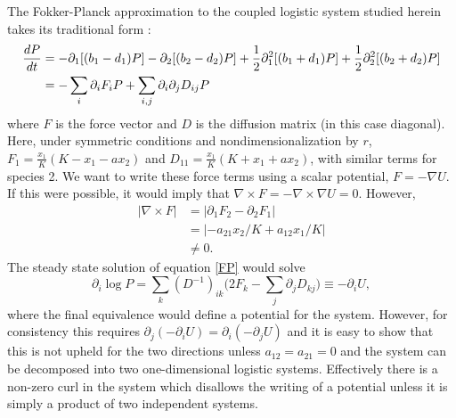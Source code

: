 The Fokker-Planck approximation to the coupled logistic system studied herein takes its traditional form \cite{Nisbet1982}:
\begin{align}
\frac{dP}{dt} &= - \partial_1[(b_1-d_1)P] - \partial_2[(b_2-d_2)P] + \frac{1}{2}\partial_1^2[(b_1+d_1)P] + \frac{1}{2}\partial_2^2[(b_2+d_2)P] \notag \\
&= -\sum_{i} \partial_i F_iP + \sum_{i,j} \partial_i\partial_j D_{ij}P \label{FP}
\end{align}%
where $F$ is the force vector and $D$ is the diffusion matrix (in this case diagonal). 
Here, under symmetric conditions and nondimensionalization by $r$, $F_1 = \frac{x_1}{K}(K - x_1 - a x_2)$ and $D_{11} = \frac{x_1}{K}(K + x_1 + a x_2)$, with similar terms for species 2. 
\iffalse%
We want to write these force terms using a scalar potential, $F=-\nabla U$. %
If this were possible, it would imply that $\nabla \times F = -\nabla \times \nabla U = 0$. 
However,%
\begin{align*}
|\nabla \times F| &= |\partial_1 F_2 - \partial_2 F_1| \\
&= |-a_{21}x_2/K + a_{12}x_1/K| \\
&\neq 0.
\end{align*}
The steady state solution of equation \ref{FP} would solve
\begin{equation*}
\partial_i \log P = \sum_k (D^{-1})_{ik} \big( 2 F_k - \sum_j \partial_j D_{kj} \big) \equiv - \partial_i U,
\end{equation*}
where the final equivalence would define a potential for the system. 
However, for consistency this requires $\partial_j \left( - \partial_i U \right) = \partial_i \left( - \partial_j U \right)$ and it is easy to show that this is not upheld for the two directions unless $a_{12}=a_{21}=0$ and the system can be decomposed into two one-dimensional logistic systems. 
Effectively there is a non-zero curl in the system which disallows the writing of a potential unless it is simply a product of two independent systems. 

